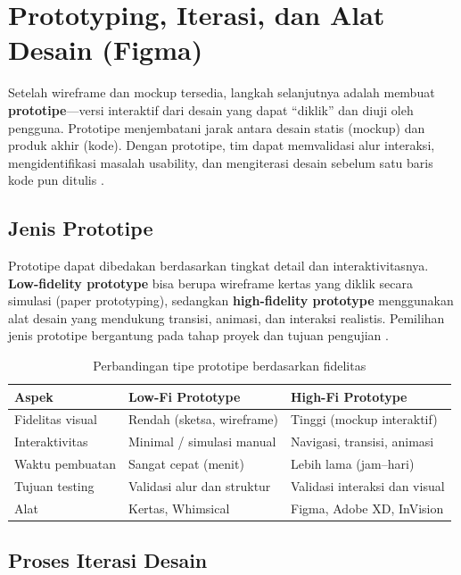 ﻿\section{Prototyping, Iterasi, dan Alat Desain (Figma)}

Setelah wireframe dan mockup tersedia, langkah selanjutnya adalah membuat \textbf{prototipe}---versi interaktif dari desain yang dapat ``diklik'' dan diuji oleh pengguna. Prototipe menjembatani jarak antara desain statis (mockup) dan produk akhir (kode). Dengan prototipe, tim dapat memvalidasi alur interaksi, mengidentifikasi masalah usability, dan mengiterasi desain sebelum satu baris kode pun ditulis \cite{webdevLearn}.

\subsection{Jenis Prototipe}

Prototipe dapat dibedakan berdasarkan tingkat detail dan interaktivitasnya. \textbf{Low-fidelity prototype} bisa berupa wireframe kertas yang diklik secara simulasi (paper prototyping), sedangkan \textbf{high-fidelity prototype} menggunakan alat desain yang mendukung transisi, animasi, dan interaksi realistis. Pemilihan jenis prototipe bergantung pada tahap proyek dan tujuan pengujian \cite{figmaDocs}.

\begin{table}[H]
\centering
\begin{tabular}{|P{3cm}|P{4.5cm}|P{4.5cm}|}
\hline
\textbf{Aspek} & \textbf{Low-Fi Prototype} & \textbf{High-Fi Prototype} \\
\hline
Fidelitas visual & Rendah (sketsa, wireframe) & Tinggi (mockup interaktif) \\
\hline
Interaktivitas & Minimal / simulasi manual & Navigasi, transisi, animasi \\
\hline
Waktu pembuatan & Sangat cepat (menit) & Lebih lama (jam--hari) \\
\hline
Tujuan testing & Validasi alur dan struktur & Validasi interaksi dan visual \\
\hline
Alat & Kertas, Whimsical & Figma, Adobe XD, InVision \\
\hline
\end{tabular}
\caption{Perbandingan tipe prototipe berdasarkan fidelitas}
\end{table}

\subsection{Proses Iterasi Desain}

